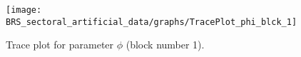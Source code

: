 \begin{figure}[H]
\centering
  \texttt{[image: BRS\_sectoral\_artificial\_data/graphs/TracePlot\_phi\_blck\_1]}\\
    \caption{Trace plot for parameter ${\phi}$ (block number 1).}
\end{figure}
